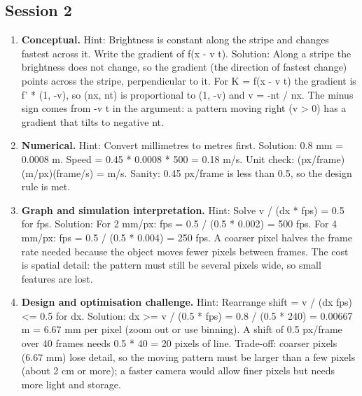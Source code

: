 \documentclass[11pt,a4paper]{article}
\begin{document}
\subsection*{Session 2}
\begin{enumerate}[nosep]
\item \textbf{Conceptual.} Hint: Brightness is constant along the stripe and changes fastest across it. Write the gradient of f(x - v t). Solution: Along a stripe the brightness does not change, so the gradient (the direction of fastest change) points across the stripe, perpendicular to it. For K = f(x - v t) the gradient is f' * (1, -v), so (nx, nt) is proportional to (1, -v) and v = -nt / nx. The minus sign comes from -v t in the argument: a pattern moving right (v \textgreater{} 0) has a gradient that tilts to negative nt.
\item \textbf{Numerical.} Hint: Convert millimetres to metres first. Solution: 0.8 mm = 0.0008 m. Speed = 0.45 * 0.0008 * 500 = 0.18 m/s. Unit check: (px/frame)(m/px)(frame/s) = m/s. Sanity: 0.45 px/frame is less than 0.5, so the design rule is met.
\item \textbf{Graph and simulation interpretation.} Hint: Solve v / (dx * fps) = 0.5 for fps. Solution: For 2 mm/px: fps = 0.5 / (0.5 * 0.002) = 500 fps. For 4 mm/px: fps = 0.5 / (0.5 * 0.004) = 250 fps. A coarser pixel halves the frame rate needed because the object moves fewer pixels between frames. The cost is spatial detail: the pattern must still be several pixels wide, so small features are lost.
\item \textbf{Design and optimisation challenge.} Hint: Rearrange shift = v / (dx fps) \textless{}= 0.5 for dx. Solution: dx \textgreater{}= v / (0.5 * fps) = 0.8 / (0.5 * 240) = 0.00667 m = 6.67 mm per pixel (zoom out or use binning). A shift of 0.5 px/frame over 40 frames needs 0.5 * 40 = 20 pixels of line. Trade-off: coarser pixels (6.67 mm) lose detail, so the moving pattern must be larger than a few pixels (about 2 cm or more); a faster camera would allow finer pixels but needs more light and storage.
\end{enumerate}
\end{document}
